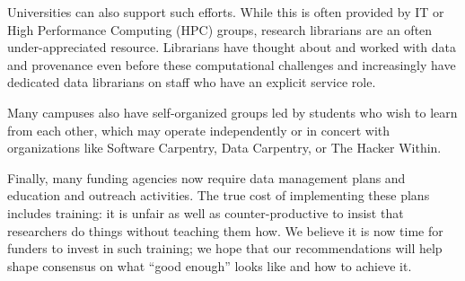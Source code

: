 \documentclass[10pt,letterpaper]{article}
\newcommand{\withurl}[2]{{#1}}
\begin{document}
Universities can also support such efforts. While this is often
provided by IT or High Performance Computing (HPC) groups, research
librarians are an often under-appreciated resource.  Librarians have
thought about and worked with data and provenance even before these
computational challenges and increasingly have dedicated data
librarians on staff who have an explicit service role.

Many campuses also have self-organized groups led by students who wish
to learn from each other, which may operate independently or in
concert with organizations like Software Carpentry, Data Carpentry, or
\withurl{The Hacker Within}{http://www.thehackerwithin.org/}.

Finally, many funding agencies now require data management plans and
education and outreach activities. The true cost of implementing these
plans includes training: it is unfair as well as counter-productive to
insist that researchers do things without teaching them how. We
believe it is now time for funders to invest in such training; we hope
that our recommendations will help shape consensus on what ``good
enough'' looks like and how to achieve it.
\end{document}
